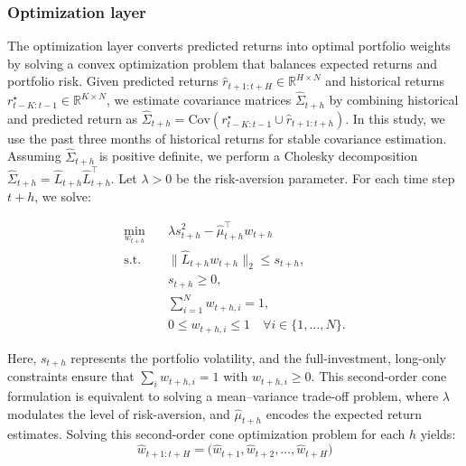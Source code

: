 \subsubsection{Optimization layer} \label{optim_layer} The optimization layer converts predicted returns into optimal portfolio weights by solving a convex optimization problem that balances expected returns and portfolio risk. Given predicted returns $\hat{r}_{t+1:t+H} \in \mathbb{R}^{H \times N}$ and historical returns $r_{t-K:t-1}^{\star} \in \mathbb{R}^{K \times N}$, we estimate covariance matrices $\hat{\Sigma}_{t+h}$ by combining historical and predicted return as $\hat{\Sigma}_{t+h} = \text{Cov}\left( r_{t-K:t-1}^{\star} \cup \hat{r}_{t+1:t+h} \right)$. In this study, we use the past three months of historical returns for stable covariance estimation. Assuming $\hat{\Sigma}_{t+h}$ is positive definite, we perform a Cholesky decomposition $\hat{\Sigma}_{t+h} = \hat{L}_{t+h}\hat{L}_{t+h}^{\top}$. Let $\lambda>0$ be the risk-aversion parameter. For each time step $t+h$, we solve:

\begin{equation}
\begin{aligned}
\min_{w_{t+h}} \quad & \lambda s_{t+h}^2 - \hat{\mu}_{t+h}^{\top} w_{t+h} \\
\text{s.t.} \quad & \|\hat{L}_{t+h} w_{t+h}\|_2 \leq s_{t+h}, \\
                      & s_{t+h} \geq 0, \\
                      & \sum_{i=1}^{N} w_{t+h,i} = 1, \\
                      & 0 \leq w_{t+h,i} \leq 1 \quad \forall i \in \{1, \ldots, N\}.
\end{aligned}
\end{equation}

Here, $s_{t+h}$ represents the portfolio volatility, and the full-investment, long-only constraints ensure that $\sum_i w_{t+h,i} = 1$ with $w_{t+h,i} \ge 0$. This second-order cone formulation is equivalent to solving a mean–variance trade-off problem, where $\lambda$ modulates the level of risk-aversion, and $\hat{\mu}_{t+h}$ encodes the expected return estimates.  Solving this second-order cone optimization problem for each $h$ yields:
\begin{equation}
    \hat{w}_{t+1:t+H} = \bigl(\hat{w}_{t+1}, \hat{w}_{t+2}, \ldots, \hat{w}_{t+H}\bigr)
\end{equation}


